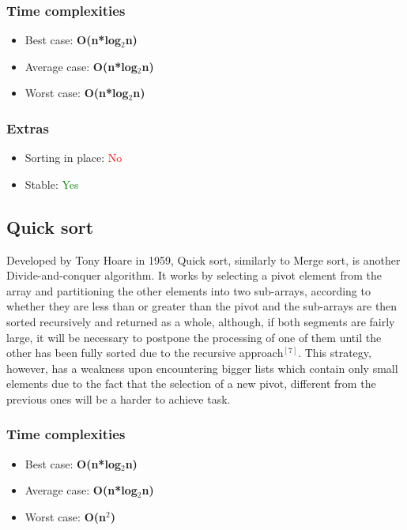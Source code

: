 \documentclass{article}
\begin{document}
\begin{multicols}{2}
\subsubsection{Time complexities}
\begin{itemize}
    \item Best case: \textbf{O(n*log$_2$n)}
    \item Average case: \textbf{O(n*log$_2$n)}
    \item Worst case: \textbf{O(n*log$_2$n)}
\end{itemize}

\subsubsection{Extras}
\begin{itemize}
    \item Sorting in place: \textcolor{red}{No}
    \item Stable: \textcolor{green}{Yes}
\end{itemize}
\bigbreak \bigbreak \bigbreak \bigbreak \bigbreak \bigbreak \bigbreak \bigbreak \bigbreak

\subsection{Quick sort}
Developed by Tony Hoare in 1959, Quick sort, similarly to Merge sort, is another Divide-and-conquer algorithm. It works by selecting a pivot element from the array and partitioning the other elements into two sub-arrays, according to whether they are less than or greater than the pivot and the sub-arrays are then sorted recursively and returned as a whole, although, if both segments are fairly large, it will be necessary to postpone the processing of one of them until the other has been fully sorted due to the recursive approach$^{[7]}$.  This strategy, however, has a weakness upon encountering bigger lists which contain only small elements due to the fact that the selection of a new pivot, different from the previous ones will be a harder to achieve task.
\subsubsection{Time complexities}
\begin{itemize}
    \item Best case: \textbf{O(n*log$_2$n)}
    \item Average case: \textbf{O(n*log$_2$n)}
    \item Worst case: \textbf{O(n$^2$)}
\end{itemize}


\end{multicols}
\end{document}
